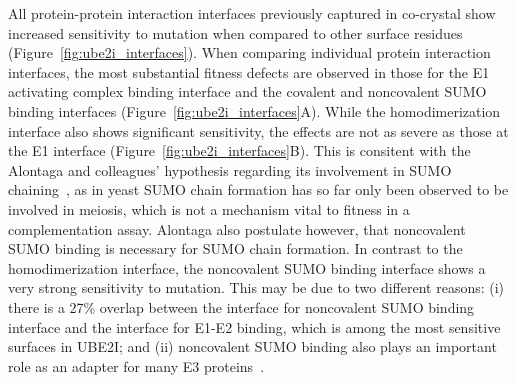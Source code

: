 All protein-protein interaction interfaces previously captured in co-crystal show increased sensitivity to mutation when compared to other surface residues (Figure~\ref{fig:ube2i_interfaces}). When comparing individual protein interaction interfaces, the most substantial fitness defects are observed in those for the E1 activating complex binding interface and the covalent and noncovalent SUMO binding interfaces (Figure~\ref{fig:ube2i_interfaces}A). While the homodimerization interface also shows significant sensitivity, the effects are not as severe as those at the E1 interface (Figure~\ref{fig:ube2i_interfaces}B). This is consitent with the Alontaga and colleagues' hypothesis regarding its involvement in SUMO chaining~\cite{alontaga_rwd_2015}, as in yeast SUMO chain formation has so far only been observed to be involved in meiosis, which is not a mechanism vital to fitness in a complementation assay. Alontaga \etal also postulate however, that noncovalent SUMO binding is necessary for SUMO chain formation. In contrast to the homodimerization interface, the noncovalent SUMO binding interface shows a very strong sensitivity to mutation. This may be due to two different reasons: (i) there is a 27\% overlap between the interface for noncovalent SUMO binding interface and the interface for E1-E2 binding, which is among the most sensitive surfaces in UBE2I; and (ii) noncovalent SUMO binding also plays an important role as an adapter for many E3 proteins~\cite{cappadocia_structural_2015}.


